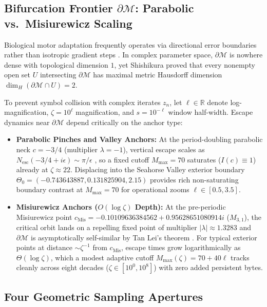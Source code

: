 \subsection{Bifurcation Frontier $\partial\mathcal{M}$: Parabolic vs.\ Misiurewicz Scaling}
\label{sec:horizon}

Biological motor adaptation frequently operates via directional error boundaries rather than isotropic gradient steps \cite{shadmehr2010error}. In complex parameter space, $\partial\mathcal{M}$ is nowhere dense with topological dimension $1$, yet Shishikura \cite{shishikura1998hausdorff} proved that every nonempty open set $U$ intersecting $\partial\mathcal{M}$ has maximal metric Hausdorff dimension $\dim_H(\partial\mathcal{M}\cap U) = 2$.

To prevent symbol collision with complex iterates $z_n$, let $\ell \in \mathbb{R}$ denote log-magnification, $\zeta = 10^\ell$ magnification, and $s = 10^{-\ell}$ window half-width. Escape dynamics near $\partial\mathcal{M}$ depend critically on the anchor type:
\begin{itemize}
    \item \textbf{Parabolic Pinches and Valley Anchors:} At the period-doubling parabolic neck $c = -3/4$ (multiplier $\lambda=-1$), vertical escape scales as $N_{\mathrm{esc}}(-3/4 + i\epsilon) \sim \pi/\epsilon$ \cite{peitgen1992chaos}, so a fixed cutoff $M_{\max}=70$ saturates ($I(c)\equiv 1$) already at $\zeta \approx 22$. Displacing into the Seahorse Valley exterior boundary $\Theta_0 = (-0.743643887, 0.131825904, 2.15)$ provides rich non-saturating boundary contrast at $M_{\max}=70$ for operational zooms $\ell \in [0.5, 3.5]$.
    \item \textbf{Misiurewicz Anchors ($O(\log\zeta)$ Depth):} At the pre-periodic Misiurewicz point $c_{\mathrm{Mis}} = -0.10109636384562 + 0.95628651080914i$ ($M_{3,1}$), the critical orbit lands on a repelling fixed point of multiplier $|\lambda| \approx 1.3283$ and $\partial\mathcal{M}$ is asymptotically self-similar by Tan Lei's theorem \cite{tanlei1990similarity}. For typical exterior points at distance $\sim \zeta^{-1}$ from $c_{\mathrm{Mis}}$, escape times grow logarithmically as $\Theta(\log\zeta)$, which a modest adaptive cutoff $M_{\max}(\zeta) = 70 + 40\ell$ tracks cleanly across eight decades ($\zeta \in [10^0, 10^8]$) with zero added persistent bytes.
\end{itemize}

\subsection{Four Geometric Sampling Apertures}
\label{sec:apertures}

